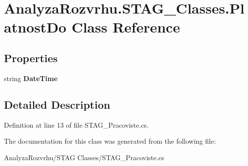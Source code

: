 \hypertarget{class_analyza_rozvrhu_1_1_s_t_a_g___classes_1_1_platnost_do}{}\section{Analyza\+Rozvrhu.\+S\+T\+A\+G\+\_\+\+Classes.\+Platnost\+Do Class Reference}
\label{class_analyza_rozvrhu_1_1_s_t_a_g___classes_1_1_platnost_do}
\subsection*{Properties}
\begin{DoxyCompactItemize}
\item 
\mbox{\label{class_analyza_rozvrhu_1_1_s_t_a_g___classes_1_1_platnost_do_a313996a893821016dd03fa4dc61f56fd}} 
string {\bfseries Date\+Time}
\end{DoxyCompactItemize}


\subsection{Detailed Description}


Definition at line 13 of file S\+T\+A\+G\+\_\+\+Pracoviste.\+cs.



The documentation for this class was generated from the following file\+:\begin{DoxyCompactItemize}
\item 
Analyza\+Rozvrhu/\+S\+T\+A\+G Classes/S\+T\+A\+G\+\_\+\+Pracoviste.\+cs\end{DoxyCompactItemize}

